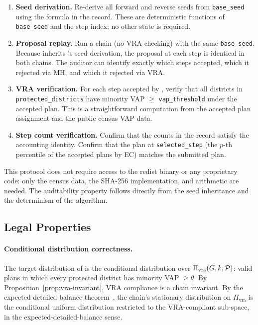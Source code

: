 \begin{enumerate}
  \item \textbf{Seed derivation.}
        Re-derive all forward and reverse seeds from \texttt{base\_seed} using
        the formula in the record.
        These are deterministic functions of \texttt{base\_seed} and the step
        index; no other state is required.

  \item \textbf{Proposal replay.}
        Run a \fr{} chain (no VRA checking) with the same \texttt{base\_seed}.
        Because \vr{} inherits \fr{}'s seed derivation, the proposal at each
        step is identical in both chains.
        The auditor can identify exactly which steps \vr{} accepted, which
        it rejected via MH, and which it rejected via VRA.

  \item \textbf{VRA verification.}
        For each step accepted by \vr{}, verify that all districts in
        \texttt{protected\_districts} have minority VAP $\geq$
        \texttt{vap\_threshold} under the accepted plan.
        This is a straightforward computation from the accepted plan
        assignment and the public census VAP data.

  \item \textbf{Step count verification.}
        Confirm that the counts in the record satisfy the accounting identity.
        Confirm that the plan at \texttt{selected\_step} (the $p$-th percentile
        of the accepted plans by EC) matches the submitted plan.
\end{enumerate}

This protocol does not require access to the redist binary or any proprietary
code: only the census data, the SHA-256 implementation, and arithmetic are
needed.
The auditability property follows directly from the seed inheritance and the
determinism of the algorithm.

\subsection{Legal Properties}

\paragraph{Conditional distribution correctness.}
The target distribution of \vr{} is the conditional distribution over
$\Pi_{\mathrm{vra}}(G, k, \mathcal{P})$: valid plans in which every protected
district has minority VAP $\geq \theta$.
By Proposition~\ref{prop:vra-invariant}, VRA compliance is a chain invariant.
By the \fr{} expected detailed balance theorem~\citep{dellaLibera2026forestRecom},
the chain's stationary distribution on $\Pi_{\mathrm{vra}}$ is the
conditional uniform distribution restricted to the VRA-compliant sub-space,
in the expected-detailed-balance sense.

